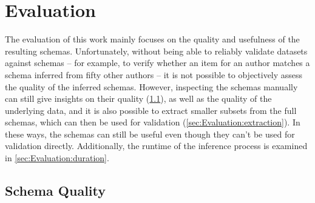 
\chapter{Evaluation}
\label{ch:Evaluation}

The evaluation of this work
mainly focuses on the quality and usefulness of the resulting \glspl{schema}.
Unfortunately, without being able to reliably validate datasets against \glspl{schema} –
for example, to verify whether an \gls{item} for an author
matches a \gls{schema} inferred from fifty other authors –
it is not possible to objectively assess the quality of the inferred \glspl{schema}.
However, inspecting the \glspl{schema} manually
can still give insights on their quality (\cref{sec:Evaluation:quality}),
as well as the quality of the underlying data,
and it is also possible to extract smaller subsets from the full \glspl{schema},
which can then be used for validation (\cref{sec:Evaluation:extraction}).
In these ways, the \glspl{schema} can still be useful even though they can’t be used for validation directly.
Additionally, the runtime of the inference process is examined in \cref{sec:Evaluation:duration}.

\section{Schema Quality}
\label{sec:Evaluation:quality}


